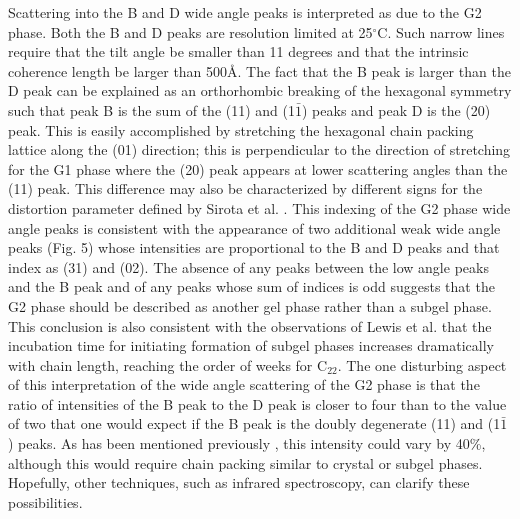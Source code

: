Scattering into the B and D wide angle peaks is interpreted as due to
the G2 phase. Both the B and D peaks are resolution limited at
25$^{\circ}$C.  Such narrow lines require that the tilt angle be
smaller than 11 degrees and that the intrinsic coherence length
be larger than 500\AA.  
The fact that the B peak is larger than the D peak can be explained as
an orthorhombic breaking of the hexagonal symmetry such that peak B is the 
sum of the
(11) and (1$\bar{1}$) peaks and peak D is the (20) peak.
This is easily accomplished by stretching the hexagonal chain packing lattice
along the (01) direction; this is perpendicular to the direction of
stretching for the G1 phase where the (20) peak appears at lower scattering 
angles than the (11) peak.  This difference may also be characterized by
different signs for the distortion parameter defined by Sirota et al.
 \cite{Sir93}. This indexing of the G2 phase wide angle peaks is consistent 
with the appearance 
of two additional weak wide angle peaks (Fig. 5) whose
intensities are proportional to the B and D peaks and that
index as (31) and (02).  The absence of any peaks between the low
angle peaks and the B peak and of any peaks whose sum of indices is odd
suggests that the G2 phase should be described as another gel phase rather
than a subgel phase.  This conclusion is also consistent with the
observations of Lewis et al. \cite{LMc87} that the incubation time for
initiating formation of subgel phases increases dramatically with chain length,
reaching the order of weeks for C$_{22}$.
The one disturbing aspect of this interpretation of
the wide angle scattering of the G2 phase is that the ratio of 
intensities of the B peak to the D peak is closer to four than to the value
of two that one would expect if the B peak is the doubly degenerate (11)
and (1$\bar{1}$) peaks.  As has been mentioned previously \cite{Sun94}, this
intensity could vary by 40\%, although this would require chain packing similar
to crystal or subgel phases.  Hopefully, other techniques, such as infrared
spectroscopy, can clarify these possibilities.

